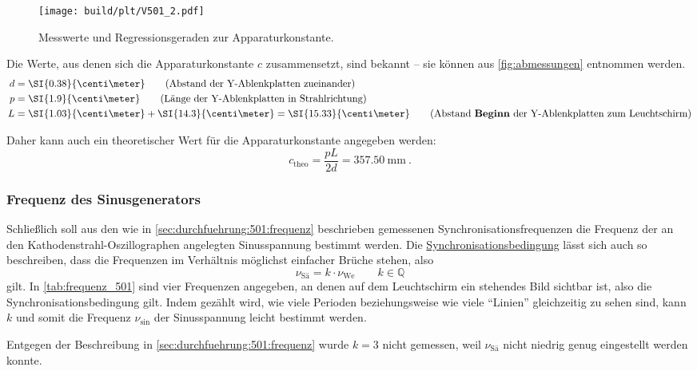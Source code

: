\begin{figure}
   \centering
    \texttt{[image: build/plt/V501\_2.pdf]}
    \caption{Messwerte und Regressionsgeraden zur Apparaturkonstante.}
    \label{fig:c_501}
\end{figure}

Die Werte, aus denen sich die Apparaturkonstante $c$ zusammensetzt,
sind bekannt – sie können aus \autoref{fig:abmessungen} entnommen werden.
\begin{align*}
  d &= \SI{0.38}{\centi\meter}
    \tag{Abstand der Y-Ablenkplatten zueinander} \\
  p &= \SI{1.9}{\centi\meter}
    \tag{Länge der Y-Ablenkplatten in Strahlrichtung} \\
  L &= \SI{1.03}{\centi\meter} + \SI{14.3}{\centi\meter} = \SI{15.33}{\centi\meter}
    \tag{Abstand \textbf{Beginn} der Y-Ablenkplatten zum Leuchtschirm} \\
\end{align*}

Daher kann auch ein theoretischer Wert für die Apparaturkonstante angegeben werden:
\[ c_\text{theo} = \frac{pL}{2d} = \SI{357.50}{\milli\meter} \ . \]

\clearpage
\subsubsection{Frequenz des Sinusgenerators}
\label{sec:auswertung:501:frequenz}

Schließlich soll aus den
wie in \autoref{sec:durchfuehrung:501:frequenz} beschrieben gemessenen
Synchronisationsfrequenzen
die Frequenz der an den Kathodenstrahl-Oszillographen angelegten Sinusspannung
bestimmt werden.
Die \hyperref[eqn:synchronisationsbedingung]{Synchronisationsbedingung} lässt sich auch so beschreiben,
dass die Frequenzen im Verhältnis möglichst einfacher Brüche stehen,
also
\[ \nu_\text{Sä} = k \cdot \nu_\text{We} \qquad k \in \mathbb{Q} \]
gilt.
In \autoref{tab:frequenz_501} sind vier Frequenzen angegeben,
an denen auf dem Leuchtschirm ein stehendes Bild sichtbar ist,
also die Synchronisationsbedingung gilt.
Indem gezählt wird,
wie viele Perioden beziehungsweise wie viele \enquote{Linien} gleichzeitig zu sehen sind,
kann $k$ und somit die Frequenz $\nu_\text{sin}$ der Sinusspannung leicht bestimmt werden.

Entgegen der Beschreibung in \autoref{sec:durchfuehrung:501:frequenz} wurde $k=3$ nicht gemessen,
weil $\nu_\text{Sä}$ nicht niedrig genug eingestellt werden konnte.

